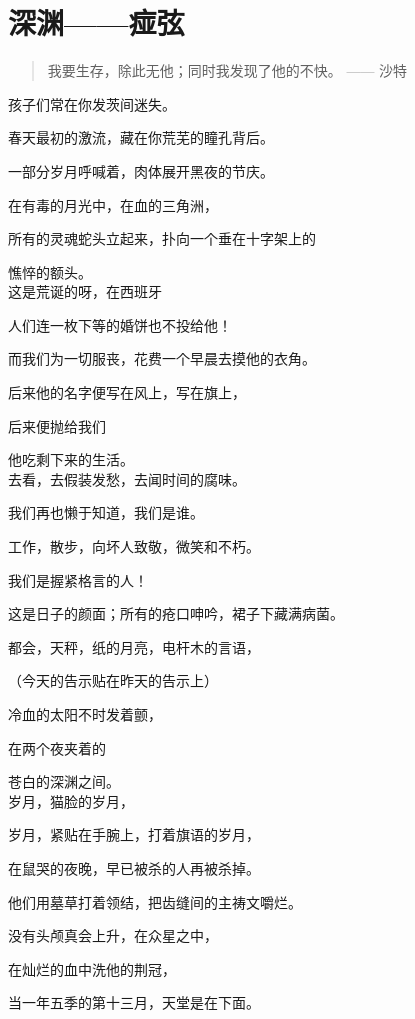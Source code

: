 \section{深渊——痖弦}

\begin{quotation}
  我要生存，除此无他；同时我发现了他的不快。 —— 沙特
\end{quotation}

孩子们常在你发茨间迷失。

春天最初的激流，藏在你荒芜的瞳孔背后。

一部分岁月呼喊着，肉体展开黑夜的节庆。

在有毒的月光中，在血的三角洲，

所有的灵魂蛇头立起来，扑向一个垂在十字架上的

憔悴的额头。\\


这是荒诞的呀，在西班牙

人们连一枚下等的婚饼也不投给他！

而我们为一切服丧，花费一个早晨去摸他的衣角。

后来他的名字便写在风上，写在旗上，

后来便抛给我们

他吃剩下来的生活。\\


去看，去假装发愁，去闻时间的腐味。

我们再也懒于知道，我们是谁。

工作，散步，向坏人致敬，微笑和不朽。

我们是握紧格言的人！

这是日子的颜面；所有的疮口呻吟，裙子下藏满病菌。

都会，天秤，纸的月亮，电杆木的言语，

（今天的告示贴在昨天的告示上）

冷血的太阳不时发着颤，

在两个夜夹着的

苍白的深渊之间。\\



岁月，猫脸的岁月，

岁月，紧贴在手腕上，打着旗语的岁月，

在鼠哭的夜晚，早已被杀的人再被杀掉。

他们用墓草打着领结，把齿缝间的主祷文嚼烂。

没有头颅真会上升，在众星之中，

在灿烂的血中洗他的荆冠，

当一年五季的第十三月，天堂是在下面。\\



